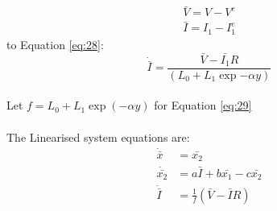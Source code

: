     \begin{align}
        \bar{V} = V - V^e \nonumber \\
        \bar{I} = I_1 - I_1^e \nonumber
    \end{align}
    to Equation \eqref{eq:28}:
    \begin{equation}\label{eq:29}
        \dot{\bar{I}} = \frac{\bar{V} - \bar{I_1}R}{\left(L_{0} + L_{1}\exp{- \alpha y}\right)}
    \end{equation}
    \hfill \break \\
    Let $f = {L_{0} + L_{1}\exp{(- \alpha y)}}$ for Equation \eqref{eq:29}\\
    \hfill \break \\
    The Linearised system equations are: \\
    \begin{align}
        \dot{\bar{x}} &= \bar{x_2}\label{eq:30} \\
        \dot{\bar{x_2}} &= a\bar{I} + b\bar{x_1} -c\bar{x_2}\label{eq:31} \\
        \dot{\bar{I}} &= \frac{1}{f}(\bar{V} - \bar{I}R)\label{eq:32}
    \end{align}